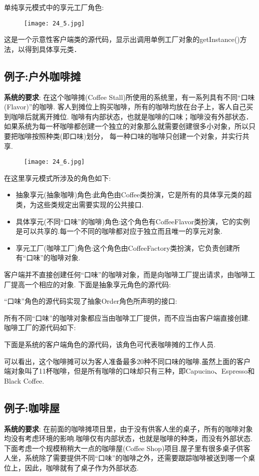 \documentclass[../main.tex]{subfiles}
\begin{document}
单纯享元模式中的享元工厂角色:
%
\begin{figure}[H]
  \texttt{[image: 24\_5.jpg]}
\end{figure}
%
这是一个示意性客户端类的源代码，显示出调用单例工厂对象的getInstance()方法，以得到具体享元类．
%

%
\subsection{例子:户外咖啡摊}
\textbf{系统的要求}:
在这个咖啡摊(Coffee Stall)所使用的系统里，有一系列具有不同``口味(Flavor)''的咖啡.
客人到摊位上购买咖啡，所有的咖啡均放在台子上，客人自己买到咖啡后就离开摊位.
咖啡有内部状态，也就是咖啡的口味；咖啡没有外部状态．
如果系统为每一杯咖啡都创建一个独立的对象那么就需要创建很多小对象，所以只要把咖啡按照种类(即口味)划分，
每一种口味的咖啡只创建一个对象，并实行共享.
%
\begin{figure}[H]
  \texttt{[image: 24\_6.jpg]}
\end{figure}
%
在这里享元模式所涉及的角色如下:
\begin{itemize}
  \item 抽象享元(抽象咖啡)角色:此角色由Coffee类扮演，它是所有的具体享元类的超类，为这些类规定出需要实现的公共接口.
  \item 具体享元(不同``口味''的咖啡)角色:这个角色有CoffeeFlavor类扮演，它的实例是可以共享的.每一个不同的咖啡都对应于独立而且唯一的享元对象.
  \item 享元工厂(咖啡工厂)角色:这个角色由CoffeeFactory类扮演，它负责创建所有``口味''的咖啡对象.
\end{itemize}
%
客户端并不直接创建任何``口味''的咖啡对象，而是向咖啡工厂提出请求，由咖啡工厂提高一个相应的对象.
下面是抽象享元角色的源代码:
%

%
``口味''角色的源代码实现了抽象Order角色所声明的接口:
%

%
所有不同``口味''的咖啡对象都应当由咖啡工厂提供，而不应当由客户端直接创建.咖啡工厂的源代码如下:
%

%
下面是系统的客户端角色的源代码，该角色可代表咖啡摊的工作人员.
%

%
可以看出，这个咖啡摊可以为客人准备最多20种不同口味的咖啡.虽然上面的客户端对象叫了11杯咖啡，但是所有咖啡的口味却只有三种，即Capucino、Espresso和Black Coffee.
%
\subsection{例子:咖啡屋}
\textbf{系统的要求}:
在前面的咖啡摊项目里，由于没有供客人坐的桌子，所有的咖啡对象均没有考虑环境的影响.咖啡仅有内部状态，也就是咖啡的种类，而没有外部状态.
下面考虑一个规模稍稍大一点的咖啡屋(Coffee Shop)项目.屋子里有很多桌子供客人坐，系统除了需要提供不同``口味''的咖啡之外，还需要跟踪咖啡被送到哪一个桌位上，因此，咖啡就有了桌子作为外部状态.
\end{document}
